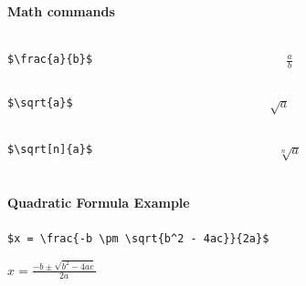 \documentclass{beamer}
\begin{document}
	\begin{frame}[fragile]
		\frametitle{\secname}
		\framesubtitle{Math commands}
		\begin{columns}
			\begin{column}{0.6\textwidth}
				\begin{example}[Fractions]
					\begin{lstlisting}[numbers=none, gobble=24]
						$\frac{a}{b}$
					\end{lstlisting}
				\end{example}
			\end{column}
			\begin{column}{0.4\textwidth}
				\Huge
				$\frac{a}{b}$
			\end{column}
		\end{columns}
		\begin{columns}
			\begin{column}{0.6\textwidth}
				\begin{example}
					\begin{lstlisting}[numbers=none, gobble=24]
						$\sqrt{a}$
					\end{lstlisting}
				\end{example}
			\end{column}
			\begin{column}{0.4\textwidth}
				\Huge
				$\sqrt{a}$
			\end{column}
		\end{columns}
		\begin{columns}
			\begin{column}{0.6\textwidth}
				\begin{example}
					\begin{lstlisting}[numbers=none, gobble=24]
						$\sqrt[n]{a}$
					\end{lstlisting}
				\end{example}
			\end{column}
			\begin{column}{0.4\textwidth}
				\Huge
				$\sqrt[n]{a}$
			\end{column}
		\end{columns}
	\end{frame}
	\begin{frame}[fragile]
		\frametitle{\secname}
		\framesubtitle{Quadratic Formula Example}
		\begin{example}
			\begin{lstlisting}[numbers=none, gobble=16]
				$x = \frac{-b \pm \sqrt{b^2 - 4ac}}{2a}$
			\end{lstlisting}
		\end{example}
		\begin{center}
			\Huge
			$x = \frac{-b \pm \sqrt{b^2 - 4ac}}{2a}$
		\end{center}
	\end{frame}
\end{document}
